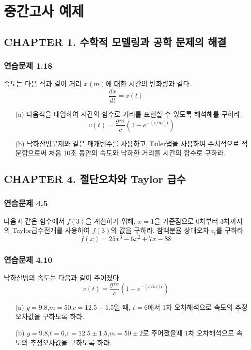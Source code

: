 \section{중간고사 예제}
\subsection{CHAPTER 1. 수학적 모델링과 공학 문제의 해결}
\subsubsection{연습문제 1.18}
속도는 다음 식과 같이 거리 $x (m)$에 대한 시간의 변화량과 같다.
\begin{equation}
\frac{dx}{dt}=v(t)
\end{equation}
\begin{itemize}
\item[(a)] 다음식을 대입하여 시간의 함수로 거리를 표현할 수 있도록 해석해를 구하라.
\begin{displaymath}
v(t)=\frac{gm}{c}\left(1-e^{-(c/m)t}\right)
\end{displaymath}
\item[(b)] 낙하산병문제와 같은 매개변수를 사용하고, Euler법을 사용하여 수치적으로 적분함으로써 처음 10초 동안의 속도와 낙하한 거리를 시간의 함수로 구하라.
\end{itemize}

\subsection{CHAPTER 4. 절단오차와 Taylor 급수}
\subsubsection{연습문제 4.5}
다음과 같은 함수에서 $f(3)$을 계산하기 위해, $x=1$을 기준점으로 0차부터 3차까지의 Taylor급수전개를 사용하여 $f(3)$의 값을 구하라. 참백분율 상대오차 $\epsilon_{t}$를 구하라
\begin{displaymath}
f(x)=25x^3-6x^2+7x-88
\end{displaymath}
\subsubsection{연습문제 4.10}
낙하산병의 속도는 다음과 같이 주어졌다.
\begin{displaymath}
v(t)=\frac{gm}{c}\left(1-e^{-(c/m)t}\right)
\end{displaymath}
\begin{itemize}
\item[(a)] $g=9.8$,$m=50$,$c=12.5\pm1.5$일 때, $t=6$에서 1차 오차해석으로 속도의 추정오차값을 구하도록 하라.
\item[(b)] $g=9.8$,$t=6$,$c=12.5\pm1.5$,$m=50\pm2$로 주어졌을때 1차 오차해석으로 속도의 추정오차값을 구하도록 하라.
\end{itemize}

